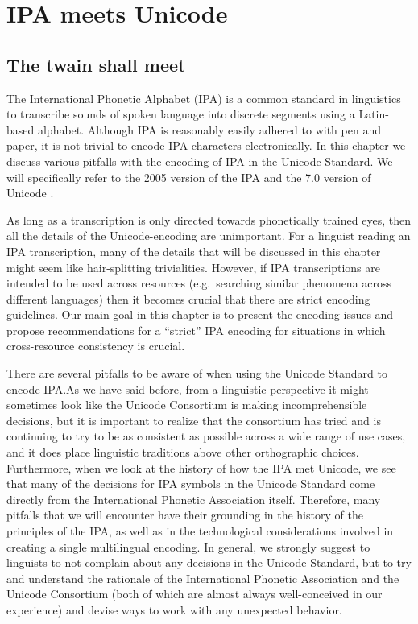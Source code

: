 \chapter{IPA meets Unicode}
\label{ipa-meets-unicode}

\section{The twain shall meet}

The International Phonetic Alphabet (IPA) is a common standard in linguistics to
transcribe sounds of spoken language into discrete segments using a Latin-based
alphabet. Although IPA is reasonably easily adhered to with pen and paper, it is
not trivial to encode IPA characters electronically. In this chapter we discuss
various pitfalls with the encoding of IPA in the Unicode Standard. We will
specifically refer to the 2005 version of the IPA \citep{IPA2005} and the 7.0
version of Unicode \citep{Unicode2014}.

As long as a transcription is only directed towards phonetically trained eyes,
then all the details of the Unicode-encoding are unimportant. For a linguist
reading an IPA transcription, many of the details that will be discussed in this
chapter might seem like hair-splitting trivialities. However, if IPA
transcriptions are intended to be used across resources (e.g.~searching similar
phenomena across different languages) then it becomes crucial that there are
strict encoding guidelines. Our main goal in this chapter is to present the
encoding issues and propose recommendations for a ``strict'' IPA encoding for
situations in which cross-resource consistency is crucial.

There are several pitfalls to be aware of when using the Unicode Standard to
encode IPA.\@ As we have said before, from a linguistic perspective it might
sometimes look like the Unicode Consortium is making incomprehensible decisions,
but it is important to realize that the consortium has tried and is continuing
to try to be as consistent as possible across a wide range of use cases, and it
does place linguistic traditions above other orthographic choices. Furthermore,
when we look at the history of how the IPA met Unicode, we see that many of the
decisions for IPA symbols in the Unicode Standard come directly from the
International Phonetic Association itself. Therefore, many pitfalls that we will
encounter have their grounding in the history of the principles of the IPA, as
well as in the technological considerations involved in creating a single
multilingual encoding. In general, we strongly suggest to linguists to not
complain about any decisions in the Unicode Standard, but to try and understand
the rationale of the International Phonetic Association and the Unicode
Consortium (both of which are almost always well-conceived in our experience)
and devise ways to work with any unexpected behavior.

